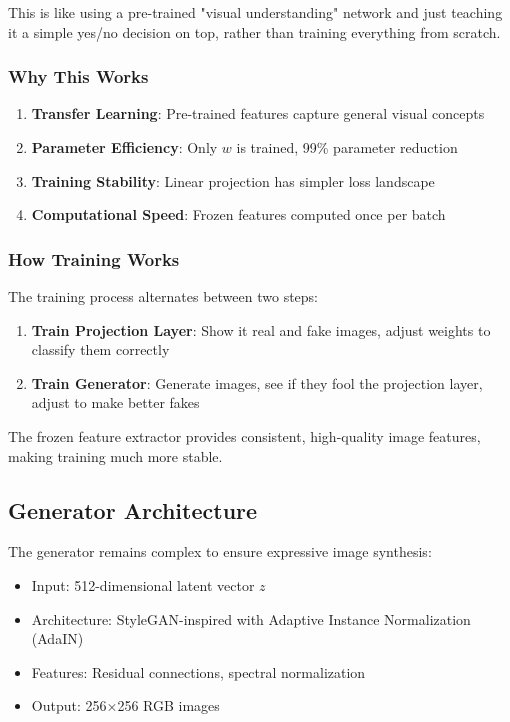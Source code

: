\documentclass[11pt,a4paper]{article}
\begin{document}
This is like using a pre-trained "visual understanding" network and just teaching it a simple yes/no decision on top, rather than training everything from scratch.

\subsubsection{Why This Works}

\begin{enumerate}[noitemsep]
    \item \textbf{Transfer Learning}: Pre-trained features capture general visual concepts
    \item \textbf{Parameter Efficiency}: Only $w$ is trained, 99\% parameter reduction
    \item \textbf{Training Stability}: Linear projection has simpler loss landscape
    \item \textbf{Computational Speed}: Frozen features computed once per batch
\end{enumerate}

\subsubsection{How Training Works}

The training process alternates between two steps:
\begin{enumerate}[noitemsep]
    \item \textbf{Train Projection Layer}: Show it real and fake images, adjust weights to classify them correctly
    \item \textbf{Train Generator}: Generate images, see if they fool the projection layer, adjust to make better fakes
\end{enumerate}

The frozen feature extractor provides consistent, high-quality image features, making training much more stable.

\subsection{Generator Architecture}

The generator remains complex to ensure expressive image synthesis:
\begin{itemize}[noitemsep]
    \item Input: 512-dimensional latent vector $z$
    \item Architecture: StyleGAN-inspired with Adaptive Instance Normalization (AdaIN)
    \item Features: Residual connections, spectral normalization
    \item Output: 256×256 RGB images
\end{itemize}
\end{document}
